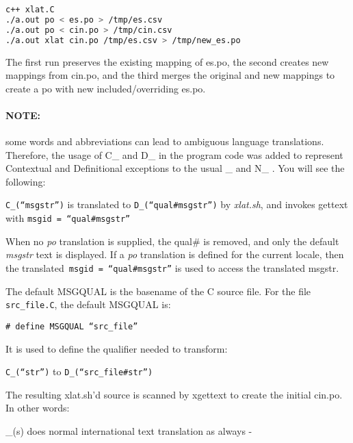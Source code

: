 \begin{lstlisting}[language=bash,numbers=none]
c++ xlat.C
./a.out po < es.po > /tmp/es.csv
./a.out po < cin.po > /tmp/cin.csv
./a.out xlat cin.po /tmp/es.csv > /tmp/new_es.po
\end{lstlisting}

The first run preserves the existing mapping of es.po, the second creates new mappings from cin.po, and the third merges the original and new mappings to create a po with new included/overriding es.po.

\paragraph{NOTE:} some words and abbreviations can lead to ambiguous language translations.  Therefore, the usage of C\_ and D\_ in the program code was added to represent Contextual and Definitional exceptions to the usual \_ and N\_ .  You will see the following:

\vspace{2ex} \texttt{C\_(“msgstr”)}  is translated to \texttt{D\_(“qual\#msgstr”)} by \textit{xlat.sh}, and invokes gettext with \texttt{msgid = “qual\#msgstr”}

\vspace{2ex} When no \textit{po} translation is supplied, the qual\# is removed, and only the default \textit{msgstr} text is displayed.   If a \textit{po} translation is defined for the current locale, then the translated\texttt{ msgid = “qual\#msgstr”} is used to access the translated msgstr.

\vspace{2ex} \noindent The default MSGQUAL is the basename of the C source file.  For the file \texttt{src\_file.C}, the default MSGQUAL is:

\vspace{2ex} \texttt{\# define MSGQUAL “src\_file”}

\vspace{2ex} \noindent It is used to define the qualifier needed to transform:

\vspace{2ex} \texttt{C\_(“str”)} to \texttt{D\_(“src\_file\#str”)}

\vspace{2ex} \noindent The resulting xlat.sh'd source is scanned by xgettext to create the initial cin.po.  In other words:

\vspace{2ex} \_(s) does normal international text translation as always -

